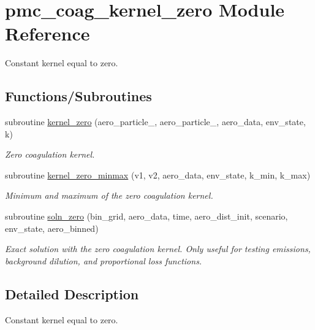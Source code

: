 \hypertarget{namespacepmc__coag__kernel__zero}{}\section{pmc\+\_\+coag\+\_\+kernel\+\_\+zero Module Reference}
\label{namespacepmc__coag__kernel__zero}


Constant kernel equal to zero.  


\subsection*{Functions/\+Subroutines}
\begin{DoxyCompactItemize}
\item 
subroutine \mbox{\hyperlink{namespacepmc__coag__kernel__zero_ac45443a66ef9e7a0dd042ca4e6d2b66d}{kernel\+\_\+zero}} (aero\+\_\+particle\+\_, aero\+\_\+particle\+\_, aero\+\_\+data, env\+\_\+state, k)
\begin{DoxyCompactList}\small\item\em Zero coagulation kernel. \end{DoxyCompactList}\item 
subroutine \mbox{\hyperlink{namespacepmc__coag__kernel__zero_ac1a17d46d81c003f44f93eafe195d3c5}{kernel\+\_\+zero\+\_\+minmax}} (v1, v2, aero\+\_\+data, env\+\_\+state, k\+\_\+min, k\+\_\+max)
\begin{DoxyCompactList}\small\item\em Minimum and maximum of the zero coagulation kernel. \end{DoxyCompactList}\item 
subroutine \mbox{\hyperlink{namespacepmc__coag__kernel__zero_af04cc325508f88c203c444b94f09cc51}{soln\+\_\+zero}} (bin\+\_\+grid, aero\+\_\+data, time, aero\+\_\+dist\+\_\+init, scenario, env\+\_\+state, aero\+\_\+binned)
\begin{DoxyCompactList}\small\item\em Exact solution with the zero coagulation kernel. Only useful for testing emissions, background dilution, and proportional loss functions. \end{DoxyCompactList}\end{DoxyCompactItemize}


\subsection{Detailed Description}
Constant kernel equal to zero. 

